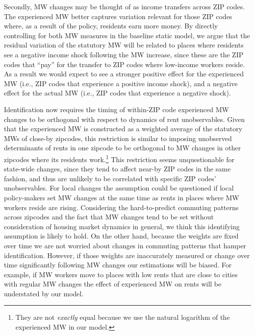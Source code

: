 Secondly, MW changes may be thought of as income transfers across ZIP codes. The experienced MW 
better captures variation relevant for those ZIP codes where, as a result of the policy, residents 
earn more money. By directly controlling for both MW measures in the baseline static model, we argue 
that the residual variation of the statutory MW will be related to places where residents see a 
negative income shock following the MW increase, since these are the ZIP codes that ``pay'' for the 
transfer to ZIP codes where low-income workers reside. As a result we would expect to see a stronger 
positive effect for the experienced MW (i.e., ZIP codes that experience a positive income shock), 
and a negative effect for the actual MW (i.e., ZIP codes that experience a negative shock).

Identification now requires the timing of within-ZIP code experienced MW changes to be orthogonal 
with respect to dynamics of rent unobservables. Given that the experienced MW is constructed as a 
weighted average of the statutory MWs of close-by zipcodes, this restriction is similar to imposing 
unobserved determinants of rents in one zipcode to be orthogonal to MW changes in other zipcodes 
where its residents work.\footnote{They are not \textit{exactly} equal because we use the natural 
	logarithm of the experienced MW in our model.}
This restriction seems unquestionable for state-wide changes, since they tend to affect near-by ZIP 
codes in the same fashion, and thus are unlikely to be correlated with specific ZIP codes' unobservables. 
For local changes the assumption could be questioned if local policy-makers set MW changes at 
the same time as rents in places where MW workers reside are rising. Considering the hard-to-predict 
commuting patterns across zipcodes and the fact that MW changes tend to be set without consideration 
of housing market dynamics in general, we think this identifying assumption is likely to hold. On the 
other hand, because the weights are fixed over time we are not worried about changes in commuting 
patterns that hamper identification. However, if those weights are inaccurately measured or change 
over time significantly following MW changes our estimations will be biased. For example, if MW workers 
move to places with low rents that are close to cities with regular MW changes the effect of 
experienced MW on rents will be understated by our model.

